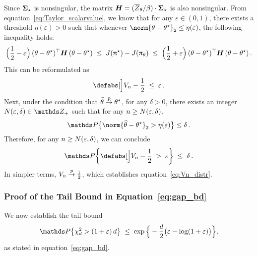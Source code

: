 	Since $\boldsymbol{\Sigma}_{\star}$ is nonsingular, the matrix $\boldsymbol{H} = (\overline{Z}_{\theta} / \beta) \cdot \boldsymbol{\Sigma}_{\star}$ is also nonsingular.
	From equation~\eqref{eq:Taylor_scalarvalue}, we know that for any $\varepsilon \in (0, 1)$, there exists a threshold $\eta(\varepsilon) > 0$ such that whenever $\norm{\paratheta - \parathetastar}_2 \leq \eta(\varepsilon)$, the following inequality holds:
	\begin{align*}
		\Big( \frac{1}{2} - \varepsilon \Big) \, (\theta - \theta^{\star})^{\top} \boldsymbol{H} \, (\theta - \theta^{\star})
		\; \leq \; J(\uppi^{\star}) - J(\uppi_{\theta})
		\; \leq \; \Big( \frac{1}{2} + \varepsilon \Big) \, (\theta - \theta^{\star})^{\top} \boldsymbol{H} \, (\theta - \theta^{\star}) \, .
	\end{align*}
	This can be reformulated as
	\begin{align*}
		\abs[\Big]{\Vn - \frac{1}{2}} \; \leq \; \varepsilon \, .
	\end{align*}
	Next, under the condition that $\widehat{\theta} \stackrel{p}{\rightarrow} \theta^{\star}$, for any $\delta > 0$, there exists an integer $N(\varepsilon, \delta) \in \Intpos$ such that for any $n \geq N(\varepsilon, \delta)$,
	\begin{align*}
		\Prob \big\{ \norm{\parathetahat - \parathetastar}_2 > \eta(\varepsilon) \big\} \leq \delta \, .
	\end{align*} 
	Therefore, for any $n \geq N(\varepsilon, \delta)$, we can conclude
	\begin{align*}
		\Prob \bigg\{ \abs[\Big]{\Vn - \frac{1}{2}} \; > \; \varepsilon \bigg\} \; \leq \; \delta \, .
	\end{align*}
	In simpler terms, $V_{n} \stackrel{p}{\rightarrow} \frac{1}{2}$, which establishes equation~\eqref{eq:Vn_distr}.
	



	\subsubsection{Proof of the Tail Bound in Equation~\eqref{eq:gap_bd}}
	\label{sec:proof:chisqtail}
	
	We now establish the tail bound
	\begin{align}
		\label{eq:chi_tail}
		\Prob\big\{ \chisquare_\Dim > (1 + \varepsilon) \, \Dim \big\}
		\;\leq\;
		\exp\Big\{-\frac{\Dim}{2} \bigl(\varepsilon - \log(1 + \varepsilon)\bigr)\Big\},
	\end{align}
	as stated in equation~\eqref{eq:gap_bd}.
	
